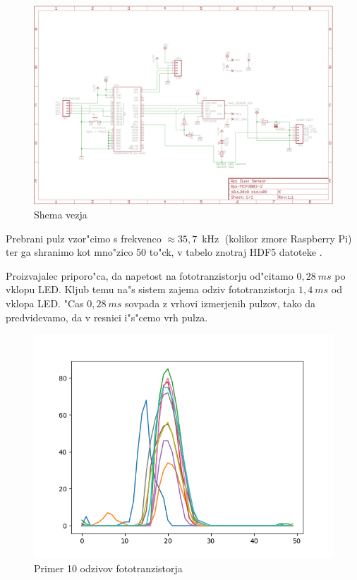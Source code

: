 \documentclass[11pt,a4paper]{article}
\DeclareMathOperator{\kHz}{kHz}
\begin{document}
\begin{figure}[H]
	\begin{center}
		\includegraphics[width=12cm]{scheme.png}
		\caption{Shema vezja}
	\end{center}
\end{figure}

Prebrani pulz vzor"cimo s frekvenco $ \approx 35,7\ \kHz $ (kolikor zmore Raspberry Pi) ter ga shranimo kot mno"zico 50 to"ck, v tabelo znotraj HDF5 datoteke \cite{hdf5}.

Proizvajalec priporo"ca, da napetost na fototranzistorju od"citamo $0,28\ ms$ po vklopu LED. Kljub temu na"s sistem zajema odziv fototranzistorja $ 1,4\ ms $ od vklopa LED. "Cas $0,28\ ms$ sovpada z vrhovi izmerjenih pulzov, tako da predvidevamo, da v resnici i"s"cemo vrh pulza. 

\begin{figure}[H]
	\begin{center}
		\includegraphics[width=12cm]{pulses_old.png}
		\caption{Primer 10 odzivov fototranzistorja}
		\label{pulses-old}
	\end{center}
\end{figure}
\end{document}
